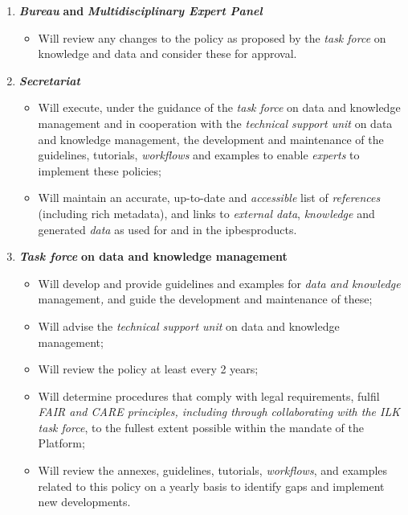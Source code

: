 \documentclass{article}
\begin{document}
\begin{enumerate}[label=(\alph*)]
    \item \textit{\textbf{Bureau }}\textbf{and }\textit{\textbf{Multidisciplinary Expert Panel}}
    \begin{itemize}
        \item Will review any changes to the policy as proposed by the \textit{task force} on knowledge and data and consider these for approval.
    \end{itemize}

    \item \textit{\textbf{Secretariat}}
    \begin{itemize}
        \item Will execute, under the guidance of the \textit{task force }on data and knowledge management and in cooperation with the \textit{technical support unit} on data and knowledge management, the development and maintenance of the guidelines, tutorials, \textit{workflows} and examples to enable \textit{experts} to implement these policies;
        \item Will maintain an accurate, up-to-date and \textit{accessible} list of \textit{references} (including rich metadata), and links to \textit{external data}, \textit{knowledge }and generated \textit{data} as used for and in the \gls{ipbesproducts}.
    \end{itemize}

    \item \textit{\textbf{Task force}}\textbf{ on data and knowledge management}
    \begin{itemize}
        \item Will develop and provide guidelines and examples for \textit{data and knowledge }management\textit{, }and guide the development and maintenance of these;
        \item Will advise the \textit{technical support unit} on data and knowledge management;
        \item Will review the policy at least every 2 years;
        \item Will determine procedures that comply with legal requirements, fulfil \textit{FAIR and CARE principles, including through collaborating with the ILK task force}, to the fullest extent possible within the mandate of the Platform;
        \item Will review the annexes, guidelines, tutorials, \textit{workflows}, and examples related to this policy on a yearly basis to identify gaps and implement new developments.
    \end{itemize}


\end{enumerate}
\end{document}
